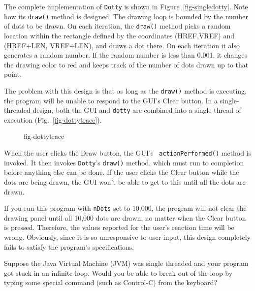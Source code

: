 The complete implementation of {\tt Dotty} is shown in
Figure~\ref{fig-singledotty}. Note how its {\tt draw()} method is
designed.  The drawing loop is bounded by the number of dots to be
drawn.  On each iteration, the {\tt draw()} method picks a
random location within the rectangle defined by the coordinates
(HREF,VREF) and (HREF+LEN, VREF+LEN), and draws a dot there.   On each
iteration it also generates a random number.  If the random number is
less than 0.001, it changes the drawing color to red and keeps track
of the number of dots drawn up to that point.

The problem with this design is that as long as the {\tt draw()}
method is executing, the program will be unable to respond to
the GUI's Clear button.  In a single-threaded design, both the
GUI and {\tt dotty} are combined into a single thread of execution
(Fig.~\ref{fig-dottytrace}).
\begin{figure}[h!]
 {fig-dottytrace}

\end{figure}
When the user clicks the Draw button, the GUI's {\tt
actionPerformed()} method is invoked.  It then invokes {\tt Dotty}'s
{\tt draw()} method, which must run to completion before anything else
can be done.  If the user clicks the Clear button while the dots are
being drawn, the GUI won't be able to get to this until all the dots
are drawn.

If you run this program with {\tt nDots} set to 10,000, the program
will not clear the drawing panel until all 10,000 dots are drawn, no
matter when the Clear button is pressed.  Therefore, the values
reported for the user's reaction time will be wrong.   Obviously, since
it is so unresponsive to user input, this design completely fails to
satisfy the program's specifications.


\label{self-study-exercise}
\begin{SSTUDY}

\item  Suppose the Java Virtual Machine (JVM) was single threaded and your
program got stuck in an infinite loop.  Would you be able to break out
of the loop by typing some special command (such as Control-C) from
the keyboard?
\end{SSTUDY}


